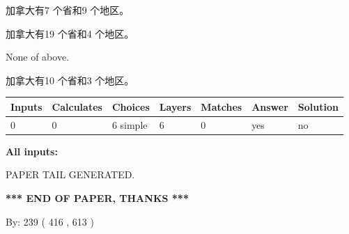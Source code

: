 \documentclass{ctexart}
\begin{document}
 
加拿大有7 个省和9 个地区。
 
 
加拿大有19 个省和4 个地区。
 
 
 None of above.
 
 
\noindent{}
 
 
加拿大有10 个省和3 个地区。
 
 
\noindent{}
 
 
   
   
   
   
\noindent\begin{tabular}{|l|l|l|l|l|l|l|}
 \hline
Inputs & Calculates & Choices & Layers & Matches & Answer & Solution \\ \hline
 0  & 
 0  & 
 6
  simple  
  & 
 6  & 
 0  & 
  yes & 
  no 
  \\ \hline
 \end{tabular}
   
   
   
   
\noindent{}
   
   
   
   
\noindent\vspace{0.1in}\hspace{-0.08in} {\textbf{\Large{All inputs: }}}
   
   
   
   
   
   
 \vspace{0.2in}
 
   
   
\vspace{2.0in} PAPER TAIL GENERATED.
   
   
   
   
\vspace{1.0in} 
{\textbf{\large{ *** END OF PAPER, THANKS *** }}} 
   
   
\hspace{1.0in} By: 
 239 ( 416 ,  613 )
   
   
   
   
\newpage 
\setcounter{page}{ 
   431001 } 
   
   
   
\end{document}
